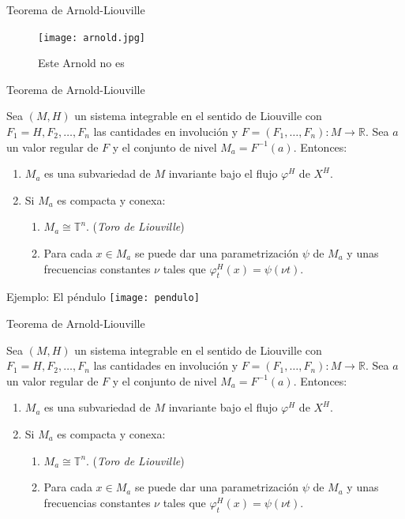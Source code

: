 \documentclass[mathserif]{beamer}
\newcommand{\TT}{\mathbb{T}}
\newcommand{\RR}{\mathbb{R}}
\begin{document}
\begin{frame}{Teorema de Arnold-Liouville}
  \begin{figure}
    \centering
    \texttt{[image: arnold.jpg]}
    \caption{Este Arnold no es}
  \end{figure}
\end{frame}

\begin{frame}{Teorema de Arnold-Liouville}
  \begin{theorem}
  Sea $(M,H)$ un sistema integrable en el sentido de Liouville con $F_1=H,F_2,\dots,F_n$ las cantidades en involución y $F=(F_1,\dots,F_n):M\rightarrow \RR$. Sea $a$ un valor regular de $F$ y el conjunto de nivel $M_a=F^{-1}(a)$. 
  Entonces:
  \begin{enumerate}
    \item $M_a$ es una subvariedad de $M$ invariante bajo el flujo $\varphi^H$ de $X^H$.
    \item Si $M_a$ es compacta y conexa:
      \begin{enumerate}
	\item $M_a\cong \TT^n$. (\emph{Toro de Liouville})
	\item Para cada $x\in M_a$ se puede dar una parametrización $\psi$ de $M_a$ y unas frecuencias constantes $\nu$ tales que $\varphi_t^H(x)=\psi(\nu t)$.
      \end{enumerate}
  \end{enumerate}
\end{theorem}
\end{frame}

\begin{frame}{Ejemplo: El péndulo}
  \centering
  \texttt{[image: pendulo]}
\end{frame}

\begin{frame}{Teorema de Arnold-Liouville}
  \begin{theorem}
  Sea $(M,H)$ un sistema integrable en el sentido de Liouville con $F_1=H,F_2,\dots,F_n$ las cantidades en involución y $F=(F_1,\dots,F_n):M\rightarrow \RR$. Sea $a$ un valor regular de $F$ y el conjunto de nivel $M_a=F^{-1}(a)$. 
  Entonces:
  \begin{enumerate}
    \item $M_a$ es una subvariedad de $M$ invariante bajo el flujo $\varphi^H$ de $X^H$.
    \item Si $M_a$ es compacta y conexa:
      \begin{enumerate}
	\item $M_a\cong \TT^n$. (\emph{Toro de Liouville})
	\item Para cada $x\in M_a$ se puede dar una parametrización $\psi$ de $M_a$ y unas frecuencias constantes $\nu$ tales que $\varphi_t^H(x)=\psi(\nu t)$.
      \end{enumerate}
  \end{enumerate}
\end{theorem}
\end{frame}
\end{document}
